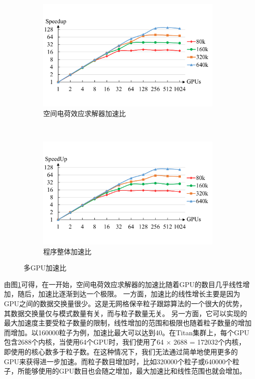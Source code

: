 \begin{figure}[!htb]
    \centering
    \begin{subfigure}[b]{0.9\textwidth}
        \includegraphics[width=\textwidth]{plot/640k_speedup_of_space_charge_kicker5log.pdf}
        \caption{空间电荷效应求解器加速比}
        \label{fig:SCTitan}
    \end{subfigure}
    \quad
    ~ %
    \begin{subfigure}[b]{0.9\textwidth}
        \includegraphics[width=\textwidth]{plot/640k_speedup_of_looptime5log.pdf}
        \caption{程序整体加速比}
        \label{fig:TotalTitan}
    \end{subfigure}
    \caption{多GPU加速比}\label{fig:Titan}
\end{figure}

由图\ref{fig:SCTitan}可得，在一开始，空间电荷效应求解器的加速比随着GPU的数目几乎线性增加，随后，加速比逐渐到达一个极限。
一方面，加速比的线性增长主要是因为GPU之间的数据交换量很少。这是无网格保辛粒子跟踪算法的一个很大的优势，其数据交换量仅与模式数量有关，而与粒子数量无关。
另一方面，它可以实现的最大加速度主要受粒子数量的限制，线性增加的范围和极限也随着粒子数量的增加而增加。以160000粒子为例，加速比最大可以达到40。在Titan集群上，每个GPU包含2688个内核，当使用64个GPU时，我们使用了64 $\times$ 2688 = 172032个内核，即使用的核心数多于粒子数。在这种情况下，我们无法通过简单地使用更多的GPU来获得进一步加速。而粒子数目增加时，比如320000个粒子或640000个粒子，所能够使用的GPU数目也会随之增加，最大加速比和线性范围也就会增加。

